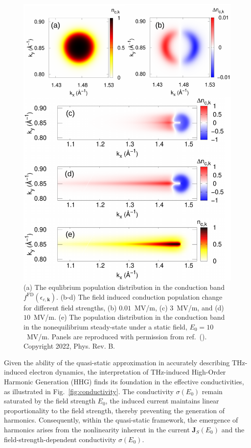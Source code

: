 \begin{figure}[htbp]
	\centering
	\includegraphics[width=1.0\linewidth]{pic/pop_fig.pdf}
	\caption{\label{fig:pop_f}
		(a) The equlibrium population distribution in the conduction band $f^{\mathrm{FD}}(\epsilon_{c,\mathbf k})$. (b-d) The field induced conduction population change for different field strengths, (b) $0.01$~MV/m, (c) $3$~MV/m, and (d) $10$~MV/m. (e) The population distribution in the conduction band in the nonequilibrium steady-state under a static field, $E_0=10$~MV/m. Panels are reproduced with permission from ref.~(\cite{PhysRevB.106.024313}). Copyright 2022, Phys. Rev. B.}
\end{figure}

Given the ability of the quasi-static approximation in accurately describing THz-induced electron
dynamics, the interpretation of THz-induced High-Order Harmonic Generation (HHG) finds its
foundation in the effective conductivities, as illustrated in Fig.~\ref{fig:conductivity}. The
conductivity $\sigma(E_0)$ remain saturated by the field strength $E_0$, the induced current
maintains linear proportionality to the field strength, thereby preventing the generation of
harmonics. Consequently, within the quasi-static framework, the emergence of harmonics arises from
the nonlinearity inherent in the current $\mathbf J_S(E_0)$ and the field-strength-dependent
conductivity $\sigma(E_0)$.

